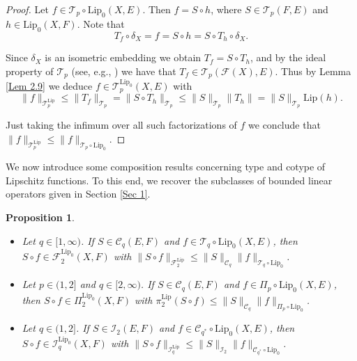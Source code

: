 \documentclass[12pt]{amsart}
\newtheorem{proposition}[theorem]{Proposition}
\def\F{\mathcal{F}}
\def\I{\mathcal{I}}
\def\C{\mathcal{C}}
\def\T{\mathcal{T}}
\def\C{\mathcal{C}}
\def\Lip{\mathrm{Lip}_0}
\def\Lipnorm{\mathrm{Lip}}
\begin{document}
\begin{proof}
	Let $f \in \T_p\circ\Lip(X,E)$. Then $f=S\circ h$, where $S \in \T_p(F,E)$ and $h\in\Lip(X,F)$. Note that
	$$
	T_f \circ \delta_X = f = S \circ h = S \circ T_h \circ \delta_X.
	$$

	Since $\delta_X$ is an isometric embedding we obtain $T_f=S\circ T_h$, and by the ideal property of $\T_p$ (see, e.g., \cite[21.2.2]{Pie-80}) we have that $T_f \in \T_p(\F(X),E)$. Thus by Lemma \ref{Lem 2.9} we deduce $f \in \T_p^{\Lip}(X,E)$ with
	$$
	\|f\|_{\T_p^{\Lipnorm}} \leq \|T_f\|_{\T_p} = \|S \circ T_h\|_{\T_p} \leq \|S\|_{\T_p}\|T_h\|=\|S\|_{\T_p}\Lipnorm(h).
	$$

	Just taking the infimum over all such factorizations of $f$ we conclude that $\|f\|_{\T_p^{\Lipnorm}} \leq \|f\|_{\T_p\circ\Lip}$.
\end{proof}

We now introduce some composition results concerning type and cotype of Lipschitz functions. To this end, we recover the subclasses of bounded linear operators given in Section \ref{Sec 1}.

\begin{proposition}\label{Prop 2.12}
	\begin{itemize}
		\item[$(i)$] Let $q\in[1,\infty)$. If $S \in \C_q(E,F)$ and $f \in \T_q \circ \Lip(X,E)$, then $S \circ f \in \F_2^{\Lip}(X,F)$ with $\|S\circ f\|_{\F_2^{\Lipnorm}} \leq \|S\|_{\C_q}\|f\|_{\T_q\circ \Lip}$.
		\item[$(ii)$] Let $p \in (1,2]$ and $q\in[2,\infty)$. If $S \in \C_q(E,F)$ and $f \in \Pi_p \circ \Lip(X,E)$, then $S\circ f \in \Pi_2^{\Lip}(X,F)$ with $\pi_2^{\Lipnorm}(S \circ f) \leq \|S\|_{\C_q}\|f\|_{\Pi_p\circ\Lip}$.
		\item[$(iii)$] Let $q \in (1,2]$. If $S \in \I_2(E,F)$ and $f \in \C_{q^*} \circ \Lip(X,E)$, then $S \circ f \in \I_q^{\Lip}(X,F)$ with $\|S \circ f\|_{\I_q^{\Lipnorm}} \leq \|S\|_{\I_2}\|f\|_{\C_{q^*}\circ\Lip}$.
	\end{itemize}
\end{proposition}
\end{document}
